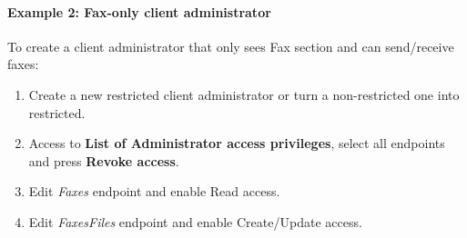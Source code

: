 \documentclass[letterpaper,10pt,english]{sphinxmanual}
\begin{document}
\paragraph{Example 2: Fax-only client administrator}

To create a client administrator that only sees Fax section and can send/receive faxes:
\begin{enumerate}
\item {} 
Create a new restricted client administrator or turn a non-restricted one into restricted.

\item {} 
Access to \textbf{List of Administrator access privileges}, select all endpoints and press \textbf{Revoke access}.

\item {} 
Edit \emph{Faxes} endpoint and enable Read access.

\item {} 
Edit \emph{FaxesFiles} endpoint and enable Create/Update access.

\end{enumerate}



\renewcommand{\indexname}{Index}
\printindex
\end{document}
